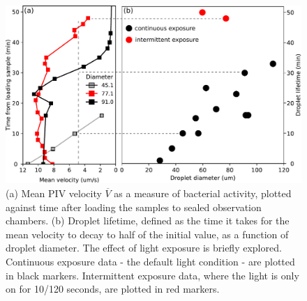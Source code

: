 \documentclass[%
10pt,
superscriptaddress,
twocolumn,
 amsmath,amssymb,
 aps,prx,
]{revtex4-2}
\begin{document}
\begin{figure}[!t]
  \includegraphics[width=\columnwidth]{droplet-lifetime}
  \caption{
  (a) Mean PIV velocity $\overline V$ as a measure of bacterial activity, plotted against time after loading the samples to sealed observation chambers.
  (b) Droplet lifetime, defined as the time it takes for the mean velocity to decay to half of the initial value, as a function of droplet diameter. 
  The effect of light exposure is briefly explored. 
  Continuous exposure data - the default light condition - are plotted in black markers.
  Intermittent exposure data, where the light is only on for 10/120 seconds, are plotted in red markers.
  }
  \label{fig:lifetime}
\end{figure}

  
\end{document}
